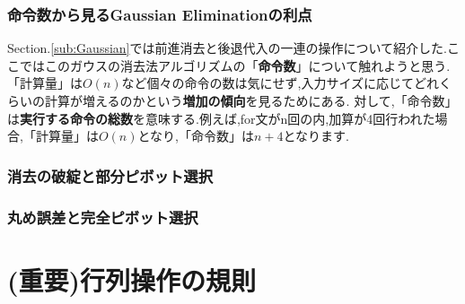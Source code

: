 \subsubsection[\texorpdfstring{\textcolor{blue}{命令数から見るGaussian Eliminationの利点}}{命令数から見るGaussian Eliminationの利点}]{命令数から見るGaussian Eliminationの利点}\label{subsub:Gaussian_order}
Section.\ref{sub:Gaussian}では前進消去と後退代入の一連の操作について紹介した.ここではこのガウスの消去法アルゴリズムの「\textbf{命令数}」について触れようと思う.「計算量」は$O(n)$など個々の命令の数は気にせず,入力サイズに応じてどれくらいの計算が増えるのかという\textbf{増加の傾向}を見るためにある.
対して,「命令数」は\textbf{実行する命令の総数}を意味する.例えば,for文がn回の内,加算が4回行われた場合,「計算量」は$O(n)$となり,「命令数」は$n+4$となります.

\subsubsection[\texorpdfstring{\textcolor{blue}{消去の破綻と部分ピボット選択}}{消去の破綻と部分ピボット選択}]{消去の破綻と部分ピボット選択}\label{subsub:partial_pivot}

\subsubsection[\texorpdfstring{\textcolor{blue}{丸め誤差と完全ピボット選択}}{丸め誤差と完全ピボット選択}]{丸め誤差と完全ピボット選択}\label{subsub:full_pivot}

\newpage
\section{(重要)行列操作の規則}\label{sec:matrixRule}

